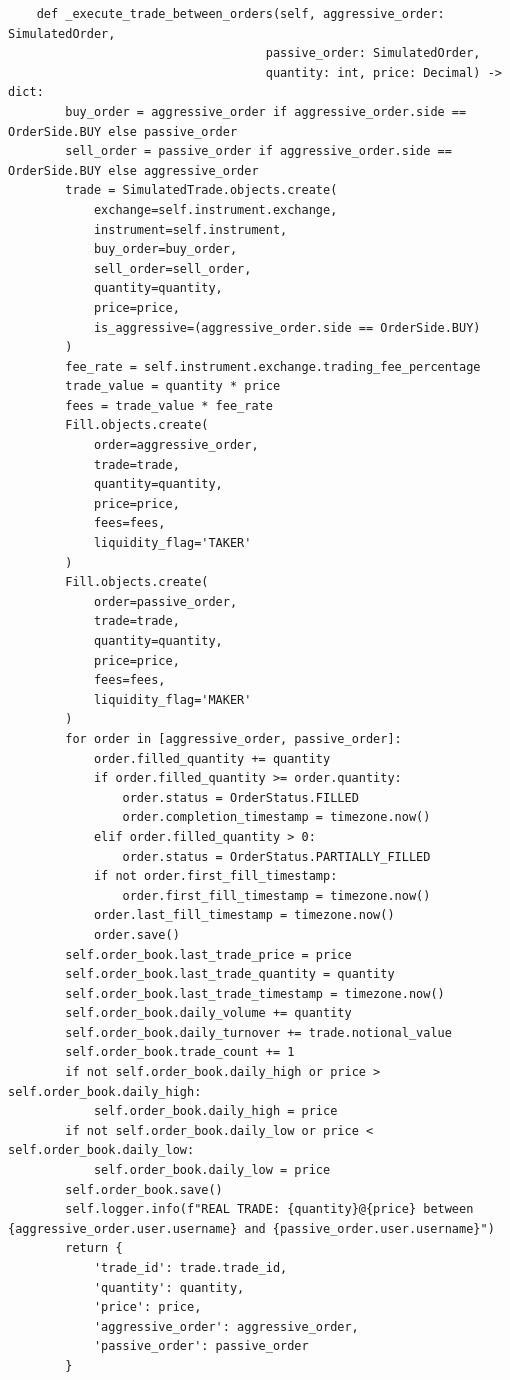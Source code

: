 \documentclass[12pt]{article}
\begin{document}
\begin{verbatim}
    def _execute_trade_between_orders(self, aggressive_order: SimulatedOrder,
                                    passive_order: SimulatedOrder,
                                    quantity: int, price: Decimal) -> dict:
        buy_order = aggressive_order if aggressive_order.side == OrderSide.BUY else passive_order
        sell_order = passive_order if aggressive_order.side == OrderSide.BUY else aggressive_order
        trade = SimulatedTrade.objects.create(
            exchange=self.instrument.exchange,
            instrument=self.instrument,
            buy_order=buy_order,
            sell_order=sell_order,
            quantity=quantity,
            price=price,
            is_aggressive=(aggressive_order.side == OrderSide.BUY)
        )
        fee_rate = self.instrument.exchange.trading_fee_percentage
        trade_value = quantity * price
        fees = trade_value * fee_rate
        Fill.objects.create(
            order=aggressive_order,
            trade=trade,
            quantity=quantity,
            price=price,
            fees=fees,
            liquidity_flag='TAKER'
        )
        Fill.objects.create(
            order=passive_order,
            trade=trade,
            quantity=quantity,
            price=price,
            fees=fees,
            liquidity_flag='MAKER'
        )
        for order in [aggressive_order, passive_order]:
            order.filled_quantity += quantity
            if order.filled_quantity >= order.quantity:
                order.status = OrderStatus.FILLED
                order.completion_timestamp = timezone.now()
            elif order.filled_quantity > 0:
                order.status = OrderStatus.PARTIALLY_FILLED
            if not order.first_fill_timestamp:
                order.first_fill_timestamp = timezone.now()
            order.last_fill_timestamp = timezone.now()
            order.save()
        self.order_book.last_trade_price = price
        self.order_book.last_trade_quantity = quantity
        self.order_book.last_trade_timestamp = timezone.now()
        self.order_book.daily_volume += quantity
        self.order_book.daily_turnover += trade.notional_value
        self.order_book.trade_count += 1
        if not self.order_book.daily_high or price > self.order_book.daily_high:
            self.order_book.daily_high = price
        if not self.order_book.daily_low or price < self.order_book.daily_low:
            self.order_book.daily_low = price
        self.order_book.save()
        self.logger.info(f"REAL TRADE: {quantity}@{price} between {aggressive_order.user.username} and {passive_order.user.username}")
        return {
            'trade_id': trade.trade_id,
            'quantity': quantity,
            'price': price,
            'aggressive_order': aggressive_order,
            'passive_order': passive_order
        }


\end{verbatim}
\end{document}
